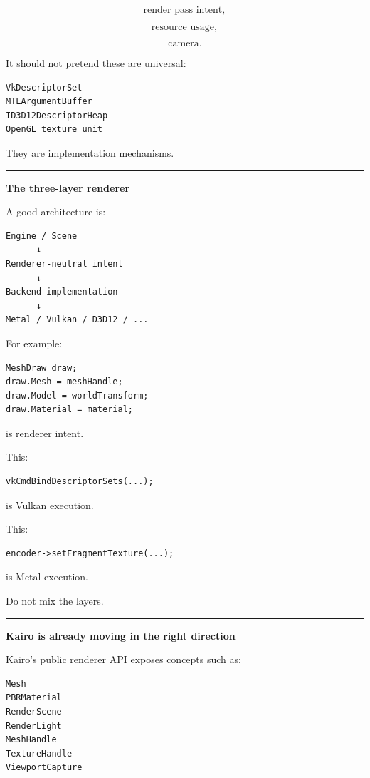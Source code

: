 \[
\text{render pass intent},
\]

\[
\text{resource usage},
\]

\[
\text{camera}.
\]

It should not pretend these are universal:

\begin{verbatim}
VkDescriptorSet
MTLArgumentBuffer
ID3D12DescriptorHeap
OpenGL texture unit
\end{verbatim}

They are implementation mechanisms.

\begin{center}\rule{0.5\linewidth}{0.5pt}\end{center}

\textbf{The three-layer renderer}

A good architecture is:

\begin{verbatim}
Engine / Scene
      ↓
Renderer-neutral intent
      ↓
Backend implementation
      ↓
Metal / Vulkan / D3D12 / ...
\end{verbatim}

For example:

\begin{verbatim}
MeshDraw draw;
draw.Mesh = meshHandle;
draw.Model = worldTransform;
draw.Material = material;
\end{verbatim}

is renderer intent.

This:

\begin{verbatim}
vkCmdBindDescriptorSets(...);
\end{verbatim}

is Vulkan execution.

This:

\begin{verbatim}
encoder->setFragmentTexture(...);
\end{verbatim}

is Metal execution.

Do not mix the layers.

\begin{center}\rule{0.5\linewidth}{0.5pt}\end{center}

\textbf{Kairo is already moving in the right direction}

Kairo's public renderer API exposes concepts such as:

\begin{verbatim}
Mesh
PBRMaterial
RenderScene
RenderLight
MeshHandle
TextureHandle
ViewportCapture
\end{verbatim}

